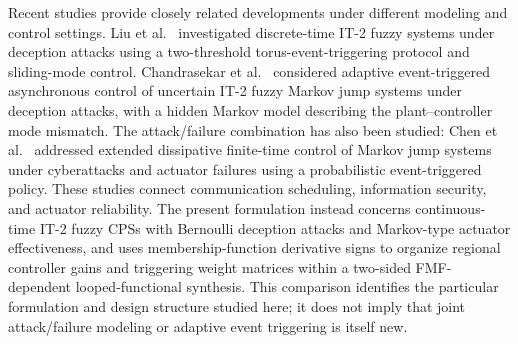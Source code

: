 \documentclass[preprint,review,fleqn,sort&compress,3p]{elsarticle}
\theoremstyle{definition} %
\theoremstyle{definition}%
\newif\ifreviewmarkup
\DeclareRobustCommand{\revdel}[1]{\ifreviewmarkup{\color{revisionred}\hypersetup{linkcolor=revisionred,citecolor=revisionred}#1}\fi}
\DeclareRobustCommand{\revadd}[1]{{\ifreviewmarkup\color{revisiongreen}\hypersetup{linkcolor=revisiongreen,citecolor=revisiongreen}\fi#1}}
\begin{document}
\label{rev:M08}\revadd{Recent studies provide closely related developments under different modeling and control settings. Liu et al.\ \cite{liuTorusEventBased2025} investigated discrete-time IT-2 fuzzy systems under deception attacks using a two-threshold torus-event-triggering protocol and sliding-mode control. Chandrasekar et al.\ \cite{chandrasekarAdaptiveEvent2026} considered adaptive event-triggered asynchronous control of uncertain IT-2 fuzzy Markov jump systems under deception attacks, with a hidden Markov model describing the plant--controller mode mismatch. The attack/failure combination has also been studied: Chen et al.\ \cite{chenProbabilisticEventTriggeredPolicy2023} addressed extended dissipative finite-time control of Markov jump systems under cyberattacks and actuator failures using a probabilistic event-triggered policy. These studies connect communication scheduling, information security, and actuator reliability. The present formulation instead concerns continuous-time IT-2 fuzzy CPSs with Bernoulli deception attacks and Markov-type actuator effectiveness, and uses membership-function derivative signs to organize regional controller gains and triggering weight matrices within a two-sided FMF-dependent looped-functional synthesis. This comparison identifies the particular formulation and design structure studied here; it does not imply that joint attack/failure modeling or adaptive event triggering is itself new.}

\label{rev:M09}\revdel{Building on the above discussion, this study addresses adaptive event-triggered
$\mathrm{H}_\infty$ control for IT-2 fuzzy CPSs affected by stochastic deception
attacks and Markov-type actuator failures. The principal contributions are fourfold:}
\end{document}
